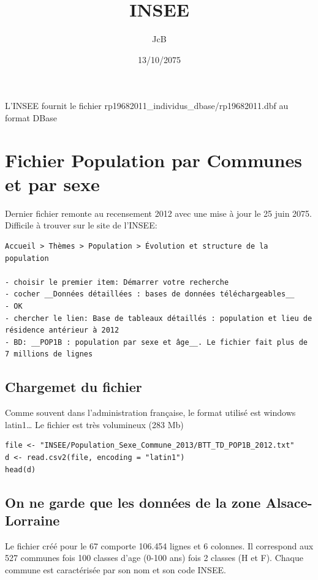 \documentclass[]{article}
\title{INSEE}
\author{JcB}
\date{13/10/2075}
\begin{document}
\maketitle


{
\hypersetup{linkcolor=black}
\setcounter{tocdepth}{2}
\tableofcontents
}
L'INSEE fournit le fichier rp19682011\_individus\_dbase/rp19682011.dbf
au format DBase

\section{Fichier Population par Communes et par
sexe}\label{fichier-population-par-communes-et-par-sexe}

Dernier fichier remonte au recensement 2012 avec une mise à jour le 25
juin 2075. Difficile à trouver sur le site de l'INSEE:

\begin{verbatim}
Accueil > Thèmes > Population > Évolution et structure de la population 

- choisir le premier item: Démarrer votre recherche
- cocher __Données détaillées : bases de données téléchargeables__
- OK
- chercher le lien: Base de tableaux détaillés : population et lieu de résidence antérieur à 2012
- BD: __POP1B : population par sexe et âge__. Le fichier fait plus de 7 millions de lignes
\end{verbatim}

\subsection{Chargemet du fichier}\label{chargemet-du-fichier}

Comme souvent dans l'administration française, le format utilisé est
windows latin1\ldots{} Le fichier est très volumineux (283 Mb)

\begin{verbatim}
file <- "INSEE/Population_Sexe_Commune_2013/BTT_TD_POP1B_2012.txt"
d <- read.csv2(file, encoding = "latin1")
head(d)
\end{verbatim}

\subsection{On ne garde que les données de la zone
Alsace-Lorraine}\label{on-ne-garde-que-les-donnees-de-la-zone-alsace-lorraine}

Le fichier créé pour le 67 comporte 106.454 lignes et 6 colonnes. Il
correspond aux 527 communes fois 100 classes d'age (0-100 ans) fois 2
classes (H et F). Chaque commune est caractérisée par son nom et son
code INSEE.
\end{document}
